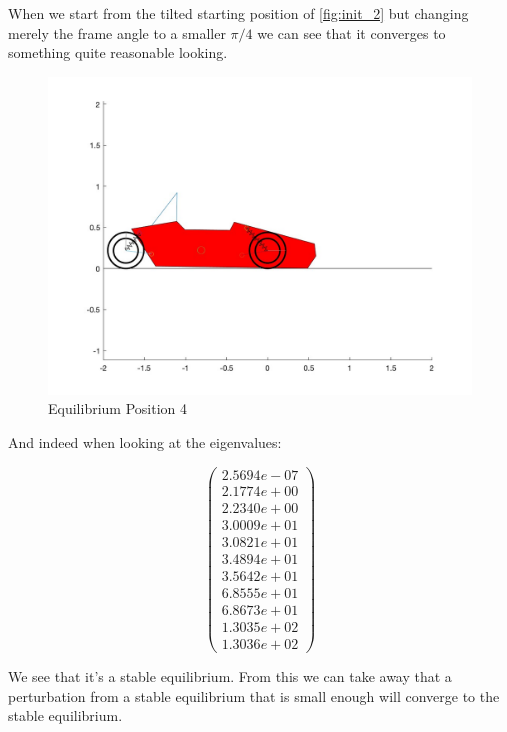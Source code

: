 When we start from the tilted starting position of \ref{fig:init_2} but changing merely the frame angle to a smaller $\pi/4$ we can see that it converges to something quite reasonable looking.
\begin{figure}[ht]
    \centering
    \includegraphics[scale=0.235]{images/Equilibrium4.jpg}
    \caption{Equilibrium Position 4}
    \label{fig:eq_4}
\end{figure}

And indeed when looking at the eigenvalues:

\begin{equation}
    \begin{pmatrix}
        2.5694e-07\\
        2.1774e+00\\
        2.2340e+00\\
        3.0009e+01\\
        3.0821e+01\\
        3.4894e+01\\
        3.5642e+01\\
        6.8555e+01\\
        6.8673e+01\\
        1.3035e+02\\
        1.3036e+02
    \end{pmatrix}
\end{equation}

We see that it's a stable equilibrium. From this we can take away that a perturbation from a stable equilibrium that is small enough will converge to the stable equilibrium.   

